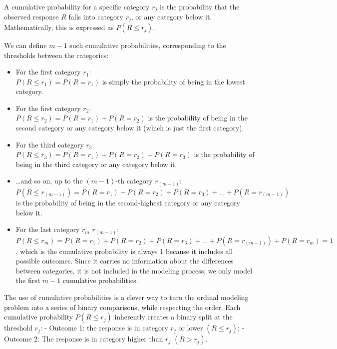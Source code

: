 \documentclass[
  letterpaper,
  DIV=11,
  numbers=noendperiod]{scrartcl}
\begin{document}
A cumulative probability for a specific category \(r_j\) is the
probability that the observed response \(R\) falls into category
\(r_j\), or any category below it. Mathematically, this is expressed as
\(P(R \leq r_j)\).

We can define \(m-1\) such cumulative probabilities, corresponding to
the thresholds between the categories:

\begin{itemize}
\item
  For the first category \(r_1\):\\
  \(P(R \leq r_1) = P(R = r_1)\) is simply the probability of being in
  the lowest category.
\item
  For the first category \(r_2\):\\
  \(P(R \leq r_2) = P(R = r_1) + P(R = r_2)\) is the probability of
  being in the second category or any category below it (which is just
  the first category).
\item
  For the third category \(r_3\):\\
  \(P(R \leq r_3) = P(R = r_1) + P(R = r_2) + P(R = r_3)\) is the
  probability of being in the third category or any category below it.
\item
  \ldots and so on, up to the \((m-1)\)-th category \(r_{(m-1)}\):\\
  \(P(R \leq r_{(m-1)}) = P(R = r_1) + P(R = r_2) + P(R = r_3) + \dots + P(R = r_{(m-1)})\)
  is the probability of being in the second-highest category or any
  category below it.
\item
  For the last category \(r_m\) \(r_{(m-1)}\):\\
  \(P(R \leq r_m) = P(R = r_1) + P(R = r_2) + P(R = r_3) + \dots + P(R = r_{(m-1)})+ P(R = r_m)=1\),
  which is the cumulative probability is always 1 because it includes
  all possible outcomes. Since it carries no information about the
  differences between categories, it is not included in the modeling
  process; we only model the first \(m-1\) cumulative probabilities.
\end{itemize}

The use of cumulative probabilities is a clever way to turn the ordinal
modeling problem into a series of binary comparisons, while respecting
the order. Each cumulative probability \(P(R \leq r_j)\) inherently
creates a binary split at the threshold \(r_j\): - Outcome 1: the
response is in category \(r_j\) or lower \((R\leq r_j)\); - Outcome 2:
The response is in category higher than \(r_j\) \((R > r_j)\).
\end{document}
